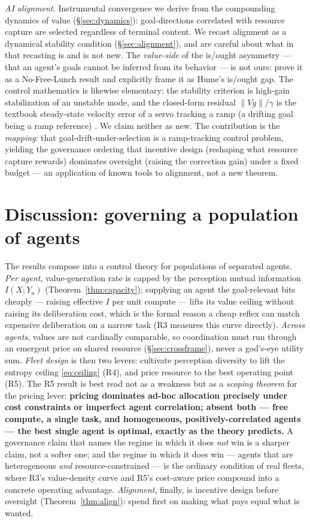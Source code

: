 \documentclass[11pt]{article}
\theoremstyle{plain}
\theoremstyle{definition}
\theoremstyle{remark}
\newcommand{\I}{I}
\begin{document}
\emph{AI alignment.} Instrumental convergence \citep{omohundro2008,bostrom2014} we derive from the compounding
dynamics of value (\S\ref{sec:dynamics}): goal-directions correlated with resource capture are selected
regardless of terminal content. We recast alignment as a dynamical stability condition (\S\ref{sec:alignment}),
and are careful about what in that recasting is and is not new. The \emph{value-side} of the is/ought asymmetry
--- that an agent's goals cannot be inferred from its behavior --- is not ours: \citet{armstrong2018occam} prove
it as a No-Free-Lunch result and explicitly frame it as Hume's is/ought gap. The control mathematics is likewise
elementary: the stability criterion is high-gain stabilization of an unstable mode, and the closed-form residual
$\|Vg\|/\gamma$ is the textbook steady-state velocity error of a servo tracking a ramp (a drifting goal being a
ramp reference) \citep{astrom2008feedback}. We claim neither as new. The contribution is the \emph{mapping}:
that goal-drift-under-selection is a ramp-tracking control problem, yielding the governance ordering that
incentive design (reshaping what resource capture rewards) dominates oversight (raising the correction gain)
under a fixed budget --- an application of known tools to alignment, not a new theorem.

\section{Discussion: governing a population of agents}\label{sec:discussion}

The results compose into a control theory for populations of separated agents. \emph{Per agent}, value-generation
rate is capped by the perception mutual information $\I(X;Y_a)$ (Theorem~\ref{thm:capacity}); supplying an agent
the goal-relevant bits cheaply --- raising effective $\I$ per unit compute --- lifts its value ceiling without
raising its deliberation cost, which is the formal reason a cheap reflex can match expensive deliberation on a
narrow task (R3 measures this curve directly). \emph{Across agents}, values are not cardinally comparable, so
coordination must run through an emergent price on shared resource (\S\ref{sec:crossframe}), never a god's-eye
utility sum. \emph{Fleet design} is then two levers: cultivate perception diversity to lift the entropy ceiling
\eqref{eq:ceiling} (R4), and price resource to the best operating point (R5). The R5 result is best read not as a
weakness but as a \emph{scoping theorem} for the pricing lever: \textbf{pricing dominates ad-hoc allocation
precisely under cost constraints or imperfect agent correlation; absent both --- free compute, a single task,
and homogeneous, positively-correlated agents --- the best single agent is optimal, exactly as the theory
predicts.} A governance claim that names the regime in which it does \emph{not} win is a sharper claim, not a
softer one; and the regime in which it does win --- agents that are heterogeneous \emph{and} resource-constrained
--- is the ordinary condition of real fleets, where R3's value-density curve and R5's cost-aware price compound
into a concrete operating advantage. \emph{Alignment}, finally, is incentive design before oversight
(Theorem~\ref{thm:align}): spend first on making what pays equal what is wanted.
\end{document}
